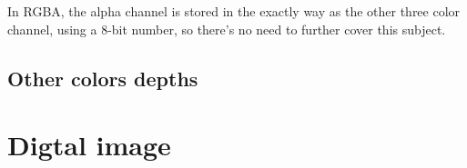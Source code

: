 
In RGBA, the alpha channel is stored in the exactly way as the other
three color channel, using a 8-bit number, so there's no need to
further cover this subject.

\subsection{Other colors depths}
\label{sec:other-colors-depths}




\section{Digtal image}
\label{sec:digtal-image}



\printbibliography[heading=subbibliography]